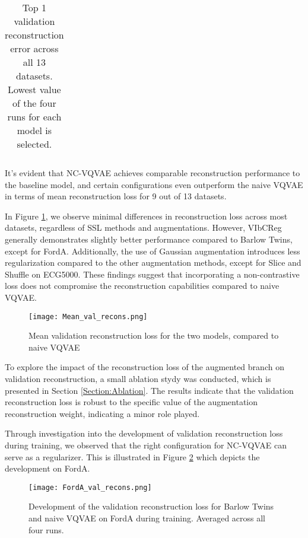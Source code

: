 \documentclass[../../thesis.tex]{subfiles}
\begin{document}
\begin{table}[H]
\begin{adjustbox}{width=\textwidth}
\begin{tabular}{lc|c|c|c|c|c|c}
  
        \bottomrule
    \end{tabular}
    \end{adjustbox}
    \caption{Top 1 validation reconstruction error across all 13 datasets. Lowest value of the four runs for each model is selected.}
    \label{tab:best_recons}
\end{table}

It's evident that NC-VQVAE achieves comparable reconstruction performance to the baseline model, and certain configurations even outperform the naive VQVAE in terms of mean reconstruction loss for 9 out of 13 datasets.\newline

In Figure \ref{fig:Mean_val_recons}, we observe minimal differences in reconstruction loss across most datasets, regardless of SSL methods and augmentations. However, VIbCReg generally demonstrates slightly better performance compared to Barlow Twins, except for FordA. Additionally, the use of Gaussian augmentation introduces less regularization compared to the other augmentation methods, except for Slice and Shuffle on ECG5000. These findings suggest that incorporating a non-contrastive loss does not compromise the reconstruction capabilities compared to naive VQVAE. \newline

\begin{figure}[h]
    \texttt{[image: Mean\_val\_recons.png]}
    \centering  
    \caption{Mean validation reconstruction loss for the two models, compared to naive VQVAE}
    \label{fig:Mean_val_recons}
\end{figure}

To explore the impact of the reconstruction loss of the augmented branch on validation reconstruction, a small ablation stydy was conducted, which is presented in Section \ref{Section:Ablation}. The results indicate that the validation reconstruction loss is robust to the specific value of the augmentation reconstruction weight, indicating a minor role played.\newline

Through investigation into the development of validation reconstruction loss during training, we observed that the right configuration for NC-VQVAE can serve as a regularizer. This is illustrated in Figure \ref{fig:FordA_val_recons} which depicts the development on FordA. 

\begin{figure}[h]
    \texttt{[image: FordA\_val\_recons.png]}
    \centering  
    \caption{Development of the validation reconstruction loss for Barlow Twins and naive VQVAE on FordA during training. Averaged across all four runs. }
    \label{fig:FordA_val_recons}
\end{figure}
\end{document}

